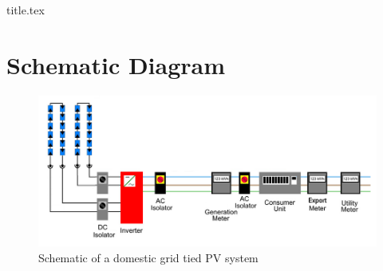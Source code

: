 \documentclass{article}
\begin{document}
{title.tex}

\tableofcontents


\section{Schematic Diagram}\label{sec:PVTheory}
\begin{figure}[h]
\centering
\includegraphics[width=\textwidth]{../figures/domestic-grid-tied-PV.png}
\caption{Schematic of a domestic grid tied PV system}
\label{fig:domesticPV-schematic}
\end{figure}
\end{document}
